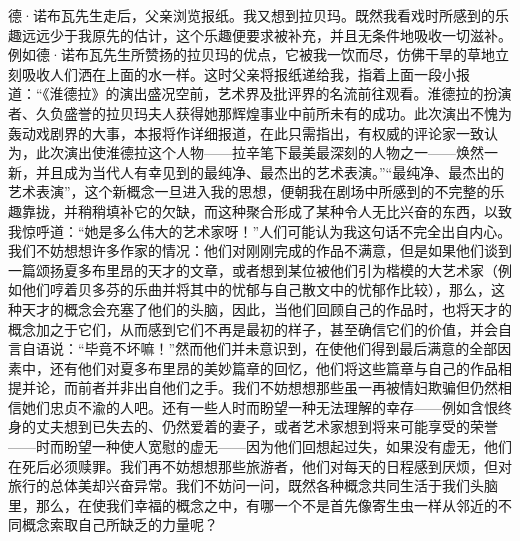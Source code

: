 \par 德·诺布瓦先生走后，父亲浏览报纸。我又想到拉贝玛。既然我看戏时所感到的乐趣远远少于我原先的估计，这个乐趣便要求被补充，并且无条件地吸收一切滋补。例如德·诺布瓦先生所赞扬的拉贝玛的优点，它被我一饮而尽，仿佛干旱的草地立刻吸收人们洒在上面的水一样。这时父亲将报纸递给我，指着上面一段小报道：“《淮德拉》的演出盛况空前，艺术界及批评界的名流前往观看。淮德拉的扮演者、久负盛誉的拉贝玛夫人获得她那辉煌事业中前所未有的成功。此次演出不愧为轰动戏剧界的大事，本报将作详细报道，在此只需指出，有权威的评论家一致认为，此次演出使淮德拉这个人物——拉辛笔下最美最深刻的人物之一——焕然一新，并且成为当代人有幸见到的最纯净、最杰出的艺术表演。”“最纯净、最杰出的艺术表演”，这个新概念一旦进入我的思想，便朝我在剧场中所感到的不完整的乐趣靠拢，并稍稍填补它的欠缺，而这种聚合形成了某种令人无比兴奋的东西，以致我惊呼道：“她是多么伟大的艺术家呀！”人们可能认为我这句话不完全出自内心。我们不妨想想许多作家的情况：他们对刚刚完成的作品不满意，但是如果他们谈到一篇颂扬夏多布里昂的天才的文章，或者想到某位被他们引为楷模的大艺术家（例如他们哼着贝多芬的乐曲并将其中的忧郁与自己散文中的忧郁作比较），那么，这种天才的概念会充塞了他们的头脑，因此，当他们回顾自己的作品时，也将天才的概念加之于它们，从而感到它们不再是最初的样子，甚至确信它们的价值，并会自言自语说：“毕竟不坏嘛！”然而他们并未意识到，在使他们得到最后满意的全部因素中，还有他们对夏多布里昂的美妙篇章的回忆，他们将这些篇章与自己的作品相提并论，而前者并非出自他们之手。我们不妨想想那些虽一再被情妇欺骗但仍然相信她们忠贞不渝的人吧。还有一些人时而盼望一种无法理解的幸存——例如含恨终身的丈夫想到已失去的、仍然爱着的妻子，或者艺术家想到将来可能享受的荣誉——时而盼望一种使人宽慰的虚无——因为他们回想起过失，如果没有虚无，他们在死后必须赎罪。我们再不妨想想那些旅游者，他们对每天的日程感到厌烦，但对旅行的总体美却兴奋异常。我们不妨问一问，既然各种概念共同生活于我们头脑里，那么，在使我们幸福的概念之中，有哪一个不是首先像寄生虫一样从邻近的不同概念索取自己所缺乏的力量呢？
